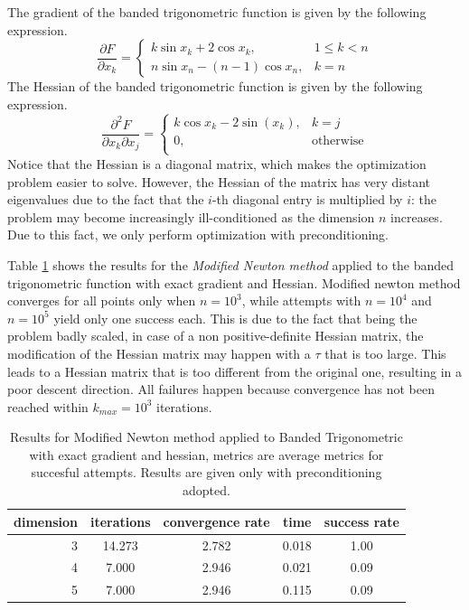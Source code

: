 The gradient of the banded trigonometric function is given by the following expression.
\begin{equation}
\frac{\partial F}{\partial x_k} = \left \{ \begin{array}{ll}
k\sin x_k + 2\cos x_k, & 1 \leq k < n \\
n\sin x_n - (n-1)\cos x_n, & k = n
\end{array} \right .
\end{equation}
The Hessian of the banded trigonometric function is given by the following expression.
\begin{equation}
\frac{\partial^2 F}{\partial x_k \partial x_j} = \left \{ \begin{array}{ll}
    k\cos x_k - 2\sin(x_k), & k = j \\
    0, & \text{otherwise} \\
\end{array} \right .
\end{equation}
Notice that the Hessian is a diagonal matrix, which makes the optimization problem easier to solve.
However, the Hessian of the matrix has very distant eigenvalues due to the fact that the $i$-th diagonal entry is multiplied by $i$: the problem may become increasingly ill-conditioned as the dimension $n$ increases.
Due to this fact, we only perform optimization with preconditioning.

Table \ref{tab:Modified_Newton_Banded_Trigonometric_exact} shows the results for the \textit{Modified Newton method} applied to the banded trigonometric function with exact gradient and Hessian.
Modified newton method converges for all points only when $n=10^3$, while attempts with $n=10^4$ and $n=10^5$ yield only one success each.
This is due to the fact that being the problem badly scaled, in case of a non positive-definite Hessian matrix, the modification of the Hessian matrix may happen with a $\tau$ that is too large.
This leads to a Hessian matrix that is too different from the original one, resulting in a poor descent direction.
All failures happen because convergence has not been reached within $k_{\textit{max}} = 10^3$ iterations.

\begin{table}
\centering
\caption{Results for Modified Newton method applied to Banded Trigonometric with exact gradient and hessian, metrics are average metrics for succesful attempts. Results are given only with preconditioning adopted.}
\label{tab:Modified_Newton_Banded_Trigonometric_exact}
\begin{tabular}{r|cc|cc}
\toprule
    dimension & iterations & convergence rate & time & success rate \\
\midrule
3 & 14.273 & 2.782 & 0.018 & 1.00 \\
4 & 7.000 & 2.946 & 0.021 & 0.09 \\
5 & 7.000 & 2.946 & 0.115 & 0.09 \\
\bottomrule
\end{tabular}
\end{table}


